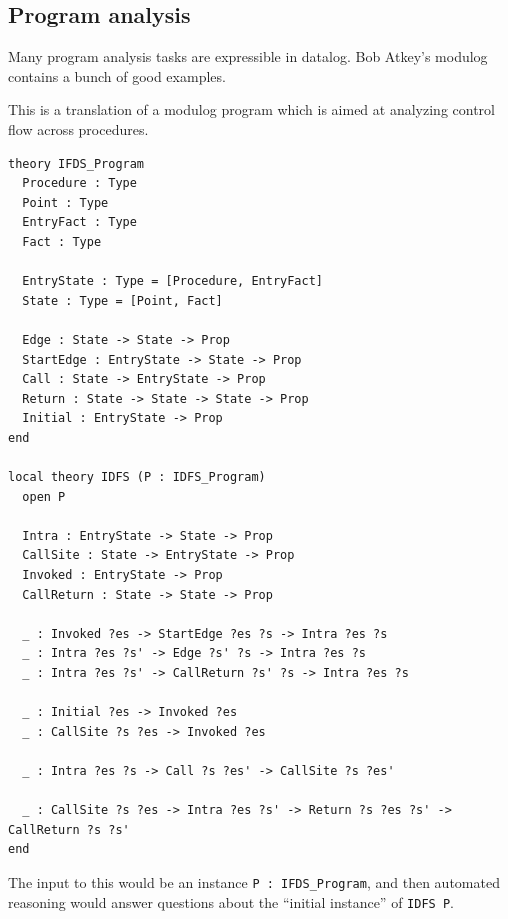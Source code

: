 \documentclass{article}
\begin{document}
\subsection{Program analysis}
Many program analysis tasks are expressible in datalog. Bob Atkey's modulog \cite{atkey-2018-modulog} contains a bunch of good examples.

\begin{example} This is a translation of a modulog program which is aimed at analyzing control flow across procedures.
\begin{verbatim}
theory IFDS_Program
  Procedure : Type
  Point : Type
  EntryFact : Type
  Fact : Type

  EntryState : Type = [Procedure, EntryFact]
  State : Type = [Point, Fact]

  Edge : State -> State -> Prop
  StartEdge : EntryState -> State -> Prop
  Call : State -> EntryState -> Prop
  Return : State -> State -> State -> Prop
  Initial : EntryState -> Prop
end

local theory IDFS (P : IDFS_Program)
  open P

  Intra : EntryState -> State -> Prop
  CallSite : State -> EntryState -> Prop
  Invoked : EntryState -> Prop
  CallReturn : State -> State -> Prop

  _ : Invoked ?es -> StartEdge ?es ?s -> Intra ?es ?s
  _ : Intra ?es ?s' -> Edge ?s' ?s -> Intra ?es ?s
  _ : Intra ?es ?s' -> CallReturn ?s' ?s -> Intra ?es ?s

  _ : Initial ?es -> Invoked ?es
  _ : CallSite ?s ?es -> Invoked ?es

  _ : Intra ?es ?s -> Call ?s ?es' -> CallSite ?s ?es'

  _ : CallSite ?s ?es -> Intra ?es ?s' -> Return ?s ?es ?s' -> CallReturn ?s ?s'
end
\end{verbatim}
The input to this would be an instance \texttt{P : IFDS\_Program}, and then automated reasoning would answer questions about the ``initial instance'' of \texttt{IDFS P}.
\end{example}



\end{document}
